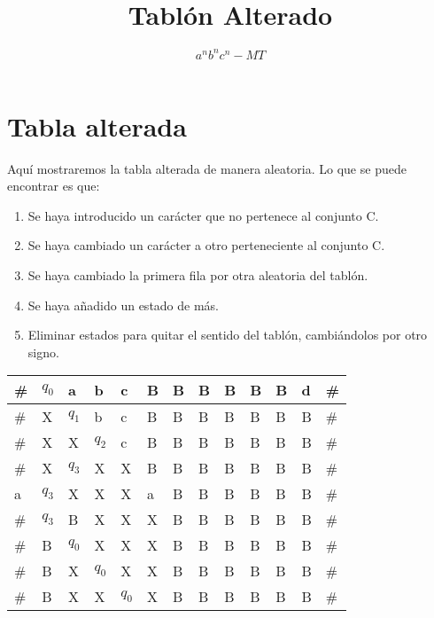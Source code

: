 ﻿\documentclass[a4paper,10pt]{article}
\title{Tablón Alterado}
\author{$a^nb^nc^n-MT$}
\date{}
\begin{document}
\maketitle

\section{Tabla alterada}

Aquí mostraremos la tabla alterada de manera aleatoria. Lo que se puede encontrar es que:
\begin{enumerate}
\item Se haya introducido un carácter que no pertenece al conjunto C.
\item Se haya cambiado un carácter a otro perteneciente al conjunto C.
\item Se haya cambiado la primera fila por otra aleatoria del tablón.
\item Se haya añadido un estado de más.
\item Eliminar estados para quitar el sentido del tablón, cambiándolos por otro signo.
\end{enumerate}\begin{table}[h]
\centering
\begin{tabular}{|l|l|l|l|l|l|l|l|l|l|l|l|l|}
\hline
	\#  &   $q_0$  &   a   &   b   &   c   &   B   &   B   &   B   &   B   &   B   &   B   &   d   &   \#	\\ \hline
	\#  &   X   &   $q_1$  &   b   &   c   &   B   &   B   &   B   &   B   &   B   &   B   &   B   &   \#	\\ \hline
	\#  &   X   &   X   &   $q_2$  &   c   &   B   &   B   &   B   &   B   &   B   &   B   &   B   &   \#	\\ \hline
	\#  &   X   &   $q_3$  &   X   &   X   &   B   &   B   &   B   &   B   &   B   &   B   &   B   &   \#	\\ \hline
	a   &   $q_3$  &   X   &   X   &   X   &   a   &   B   &   B   &   B   &   B   &   B   &   B   &   \#	\\ \hline
	\#  &   $q_3$  &   B   &   X   &   X   &   X   &   B   &   B   &   B   &   B   &   B   &   B   &   \#	\\ \hline
	\#  &   B   &   $q_0$  &   X   &   X   &   X   &   B   &   B   &   B   &   B   &   B   &   B   &   \#	\\ \hline
	\#  &   B   &   X   &   $q_0$  &   X   &   X   &   B   &   B   &   B   &   B   &   B   &   B   &   \#	\\ \hline
	\#  &   B   &   X   &   X   &   $q_0$  &   X   &   B   &   B   &   B   &   B   &   B   &   B   &   \#	\\ \hline

\end{tabular}
\end{table}
\end{document}

